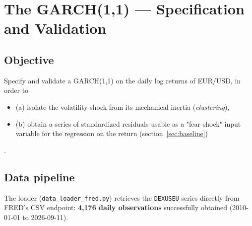 \documentclass[12pt,a4paper]{article}
\begin{document}

\newpage
\section{The GARCH(1,1) --- Specification and Validation}
\label{sec:garch}

\subsection{Objective}

Specify and validate a GARCH(1,1) on the daily log returns
of EUR/USD, in order to
\begin{itemize}
	\item (a) isolate the volatility shock from its mechanical
	inertia (\emph{clustering}), 
	\item (b) obtain a series of standardized
	residuals usable as a "fear shock" input variable
	for the regression on the return (section~\ref{sec:baseline})
\end{itemize}
.

\subsection{Data pipeline}
\label{sec:garch-data}



The loader (\texttt{data\_loader\_fred.py}) retrieves the
\texttt{DEXUSEU} series directly from FRED's CSV
endpoint: \textbf{4,176 daily observations} successfully obtained (2010-01-01 to 2026-09-11).


\end{document}

